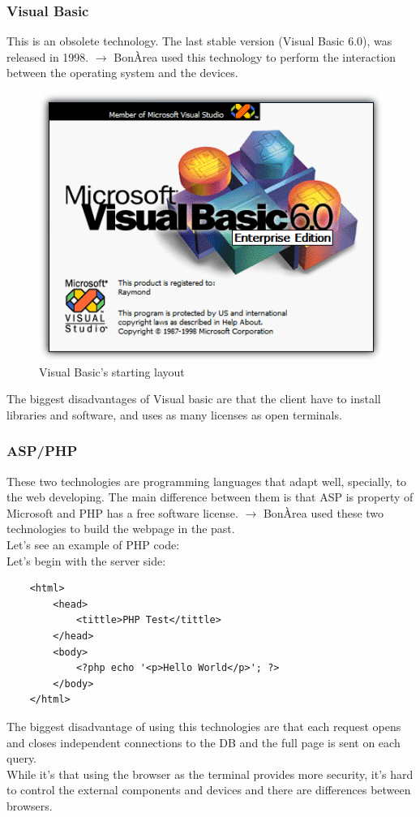 \documentclass[12pt]{article}
\begin{document}
\subsubsection*{Visual Basic}
This is an obsolete technology. The last stable version (Visual Basic 6.0), was released in 1998. $\longrightarrow$ BonÀrea used this technology to perform the interaction between the operating system and the devices.
\begin{figure}[H]
    \centering
    \includegraphics[scale = 0.7]{Images/VB-6.0.png}
    \caption{Visual Basic's starting layout}
    \label{fig:VB}
\end{figure}
The biggest disadvantages of Visual basic are that the client have to install libraries and software, and uses as many licenses as open terminals.
\subsubsection*{ASP/PHP}
These two technologies are programming languages that adapt well, specially, to the web developing. The main difference between them is that ASP is property of Microsoft and PHP has a free software license. $\longrightarrow$ BonÀrea used these two technologies to build the webpage in the past.\\
Let's see an example of PHP code:\\
Let's begin with the server side:
\begin{lstlisting}
    <html>
        <head>
            <tittle>PHP Test</tittle>
        </head>
        <body>
            <?php echo '<p>Hello World</p>'; ?>
        </body>
    </html>
\end{lstlisting}
The biggest disadvantage of using this technologies are that each request opens and closes independent connections to the DB and the full page is sent on each query.\\
While it's that using the browser as the terminal provides more security, it's hard to control the external components and devices and there are differences between browsers.
\end{document}
